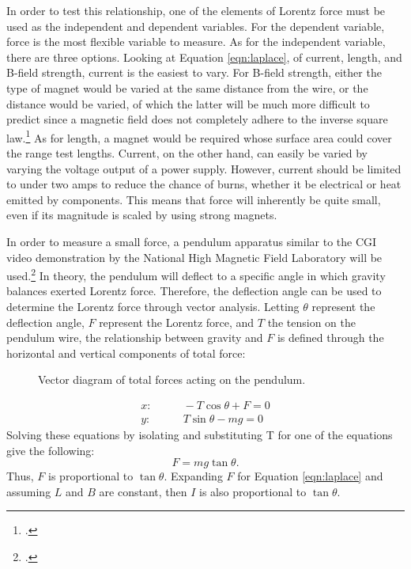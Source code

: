 In order to test this relationship, one of the elements of Lorentz force must be used as the independent and dependent variables.
For the dependent variable, force is the most flexible variable to measure.
As for the independent variable, there are three options.
Looking at Equation \eqref{eqn:laplace}, of current, length, and B-field strength, current is the easiest to vary.
For B-field strength, either the type of magnet would be varied at the same distance from the wire, or the distance would be varied, of which the latter will be much more difficult to predict since a magnetic field does not completely adhere to the inverse square law.\footcite{wwdistance}
As for length, a magnet would be required whose surface area could cover the range test lengths.
Current, on the other hand, can easily be varied by varying the voltage output of a power supply.
However, current should be limited to under two amps to reduce the chance of burns, whether it be electrical or heat emitted by components.
This means that force will inherently be quite small, even if its magnitude is scaled by using strong magnets.

In order to measure a small force, a pendulum apparatus similar to the CGI video demonstration by the National High Magnetic Field Laboratory will be used.\footcite{nmllorentz}
In theory, the pendulum will deflect to a specific angle in which gravity balances exerted Lorentz force.
Therefore, the deflection angle can be used to determine the Lorentz force through vector analysis.
Letting $\theta$ represent the deflection angle, $F$ represent the Lorentz force, and $T$ the tension on the pendulum wire, the relationship between gravity and $F$ is defined through the horizontal and vertical components of total force:
\begin{figure}[t!]
	\centering
	\caption{Vector diagram of total forces acting on the pendulum.}
	\vspace{-1.5em}
	\label{fig:vector}
\end{figure}
\begin{align*}
	x:& \qquad -T \cos\theta + F =0 \\
	y:& \qquad T \sin\theta - mg =0
\end{align*}
Solving these equations by isolating and substituting T for one of the equations give the following:
\begin{equation}
	F = mg \tan\theta \text{.} \label{eqn:experiment}
\end{equation}
Thus, $F$ is proportional to $\tan\theta$. Expanding $F$ for Equation \eqref{eqn:laplace} and assuming $L$ and $B$ are constant, then $I$ is also proportional to $\tan\theta$.
